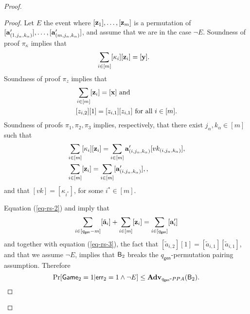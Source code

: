 \begin{proof}
\begin{proof}
Let $E$ the event where $[\mathbf{z}_1],\ldots,[\mathbf{z}_m]$ is a permutation of $[\mathbf{a}'_{(1,j_\alpha,k_\alpha)}],\ldots,\allowbreak[\mathbf{a}'_{(m,j_\alpha,k_\alpha)}]$, and assume that we are in the case $\neg E$.
Soundness of proof $\pi_\kappa$ implies that
\begin{align*}
&\sum_{i\in[m]}[\kappa_i][\mathbf{z}_i]=[\mathbf{y}].
\end{align*}
Soundness of proof $\pi_z$ implies that
\begin{align}
&\sum_{i\in[m]}[\mathbf{z}_i]=[\mathbf{x}]\text{ and}\nonumber\\
&[z_{i,2}][1]=[z_{i,1}][z_{i,1}] \text{ for all }i\in[m].\label{eq-rs-3}
\end{align}
Soundness of proofs $\pi_1,\pi_2,\pi_3$ implies, respectively, that there exist $j_\alpha,k_\alpha\in[m]$ such that
\begin{align}
&\sum_{i\in[m]}[\kappa_i][\mathbf{z}_i]=\sum_{i\in[m]}\mathbf{a}'_{(i,j_\alpha,k_\alpha)}[vk_{(i,j_\alpha,k_\alpha)}],\label{eq-rs-1}\\
&\sum_{i\in[m]}[\mathbf{z}_i]=\sum_{i\in[m]}[\mathbf{a}'_{(i,j_\alpha,k_\alpha)}], \label{eq-rs-2},
\end{align}
and that $[vk]=[\kappa_{i^*}]$, for some $i^*\in[m]$.

Equation (\ref{eq-rs-2}) and imply that
$$
\sum_{i\in[{q_\mathsf{gen}}-m]}[\tilde{\mathbf{a}}_i]+\sum_{i\in[m]}[\mathbf{z}_i] = \sum_{i\in[{q_\mathsf{gen}}]}[\mathbf{a}'_i]
$$
and together with equation (\ref{eq-rs-3}), the fact that $[\tilde{a}_{i,2}][1]=[\tilde{a}_{i,1}][\tilde{a}_{i,1}]$, and that we assume $\neg E$, implies that 
$\mathsf{B}_2$ breaks the ${q_\mathsf{gen}}$-permutation pairing assumption. Therefore
$$\Pr[\mathsf{Game}_2=1|\mathsf{err}_2=1 \wedge\neg E]\leq\mathbf{Adv}_{{q_\mathsf{gen}}\mbox{-}PPA}(\mathsf{B}_2).$$


\end{proof}
\end{proof}
